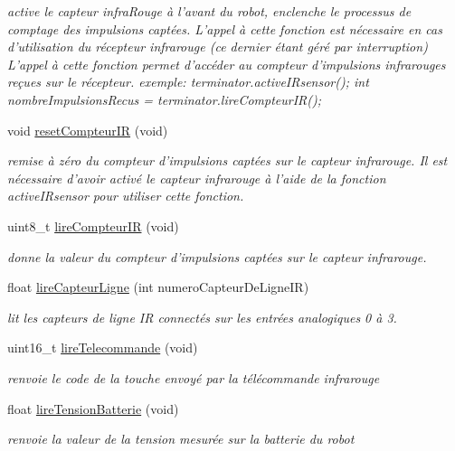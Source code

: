 \begin{DoxyCompactItemize}
\begin{DoxyCompactList}\small\item\em active le capteur infra\-Rouge à l'avant du robot, enclenche le processus de comptage des impulsions captées. L'appel à cette fonction est nécessaire en cas d'utilisation du récepteur infrarouge (ce dernier étant géré par interruption) L'appel à cette fonction permet d'accéder au compteur d'impulsions infrarouges reçues sur le récepteur. exemple\-: terminator.\-active\-I\-Rsensor(); int nombre\-Impulsions\-Recus = terminator.\-lire\-Compteur\-I\-R(); \end{DoxyCompactList}\item 
void \hyperlink{class_d_f_robot2_w_d_a97a26dbb9fa69dca838d30e3a8f21ff9}{reset\-Compteur\-I\-R} (void)
\begin{DoxyCompactList}\small\item\em remise à zéro du compteur d'impulsions captées sur le capteur infrarouge. Il est nécessaire d'avoir activé le capteur infrarouge à l'aide de la fonction active\-I\-Rsensor pour utiliser cette fonction. \end{DoxyCompactList}\item 
uint8\-\_\-t \hyperlink{class_d_f_robot2_w_d_aade657e6ba709d065911d0e0cf00a3c3}{lire\-Compteur\-I\-R} (void)
\begin{DoxyCompactList}\small\item\em donne la valeur du compteur d'impulsions captées sur le capteur infrarouge. \end{DoxyCompactList}\item 
float \hyperlink{class_d_f_robot2_w_d_aa9d9400ca10243f78260dfb8708c095b}{lire\-Capteur\-Ligne} (int numero\-Capteur\-De\-Ligne\-I\-R)
\begin{DoxyCompactList}\small\item\em lit les capteurs de ligne I\-R connectés sur les entrées analogiques 0 à 3. \end{DoxyCompactList}\item 
uint16\-\_\-t \hyperlink{class_d_f_robot2_w_d_a0cb304838b37324047ad57620c320a0d}{lire\-Telecommande} (void)
\begin{DoxyCompactList}\small\item\em renvoie le code de la touche envoyé par la télécommande infrarouge \end{DoxyCompactList}\item 
float \hyperlink{class_d_f_robot2_w_d_aef9611e8abfe3c2693f700601a4766e9}{lire\-Tension\-Batterie} (void)
\begin{DoxyCompactList}\small\item\em renvoie la valeur de la tension mesurée sur la batterie du robot \end{DoxyCompactList}\end{DoxyCompactItemize}


